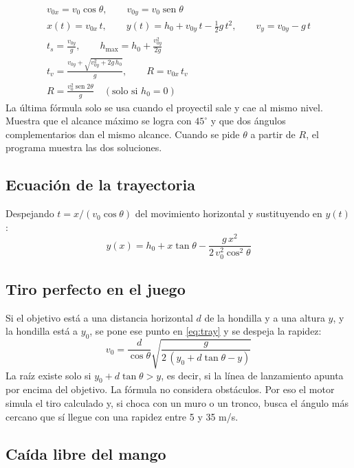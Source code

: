 \documentclass[11pt,letterpaper]{article}
\providecommand{\sen}{\operatorname{sen}}
\begin{document}
\begin{gather}
  v_{0x} = v_0\cos\theta, \qquad v_{0y} = v_0\sen\theta \\
  x(t) = v_{0x}\,t, \qquad y(t) = h_0 + v_{0y}\,t - \tfrac12 g\,t^2, \qquad v_y = v_{0y} - g\,t \\
  t_s = \frac{v_{0y}}{g}, \qquad h_{\max} = h_0 + \frac{v_{0y}^2}{2g} \\
  t_v = \frac{v_{0y} + \sqrt{v_{0y}^2 + 2g\,h_0}}{g}, \qquad R = v_{0x}\,t_v \\
  R = \frac{v_0^2 \sen 2\theta}{g} \quad (\text{solo si } h_0 = 0)
\end{gather}
La última fórmula solo se usa cuando el proyectil sale y cae al mismo nivel. Muestra que el alcance máximo se logra con $45^\circ$ y que dos ángulos complementarios dan el mismo alcance. Cuando se pide $\theta$ a partir de $R$, el programa muestra las dos soluciones.

\subsection{Ecuación de la trayectoria}

Despejando $t = x/(v_0\cos\theta)$ del movimiento horizontal y sustituyendo en $y(t)$:
\begin{equation}
  \boxed{\,y(x) = h_0 + x\tan\theta - \frac{g\,x^2}{2\,v_0^2\cos^2\theta}\,}
  \label{eq:tray}
\end{equation}

\subsection{Tiro perfecto en el juego}

Si el objetivo está a una distancia horizontal $d$ de la hondilla y a una altura $y$, y la hondilla está a $y_0$, se pone ese punto en \eqref{eq:tray} y se despeja la rapidez:
\begin{equation}
  \boxed{\,v_0 = \frac{d}{\cos\theta}\sqrt{\frac{g}{2\,(y_0 + d\tan\theta - y)}}\,}
  \label{eq:perfecto}
\end{equation}
La raíz existe solo si $y_0 + d\tan\theta > y$, es decir, si la línea de lanzamiento apunta por encima del objetivo. La fórmula no considera obstáculos. Por eso el motor simula el tiro calculado y, si choca con un muro o un tronco, busca el ángulo más cercano que sí llegue con una rapidez entre 5 y 35 m/s.

\subsection{Caída libre del mango}
\end{document}
